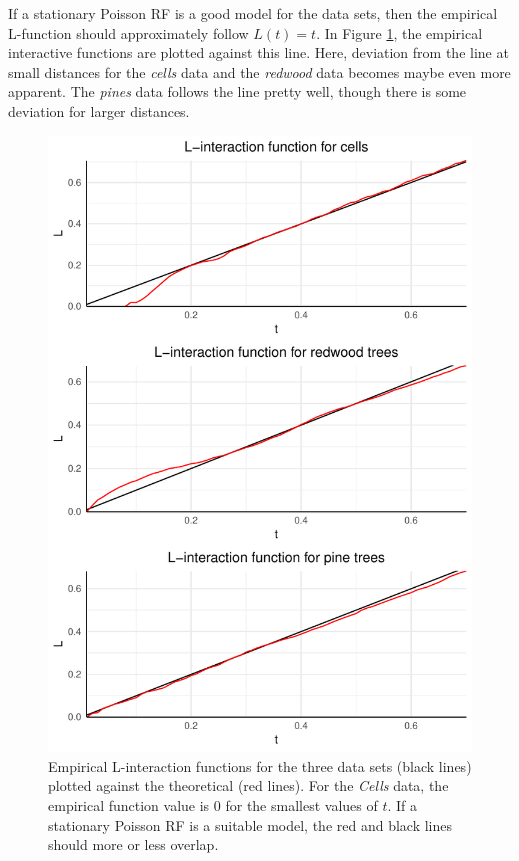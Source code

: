 If a stationary Poisson RF is a good model for the data sets, then the empirical L-function should approximately follow $L(t) = t$. In Figure \ref{fig:L_emp_theor}, the empirical interactive functions are plotted against this line. Here, deviation from the line at small distances for the \textit{cells} data and the \textit{redwood} data becomes maybe even more apparent. The \textit{pines} data follows the line pretty well, though there is some deviation for larger distances. 

\begin{figure}
    \centering
    \includegraphics[scale=0.9]{figures/prob1_L_emp_theor.pdf}
    \caption{Empirical L-interaction functions for the three data sets (black lines) plotted against the theoretical (red lines). For the \textit{Cells} data, the empirical function value is $0$ for the smallest values of $t$. If a stationary Poisson RF is a suitable model, the red and black lines should more or less overlap.}
    \label{fig:L_emp_theor}
\end{figure}

